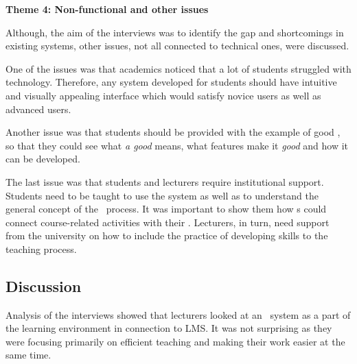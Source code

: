 \textbf{Theme 4: Non-functional and other issues}

Although, the aim of the interviews was to identify the gap and shortcomings in
existing systems, other issues, not all connected to technical ones, were
discussed.

One of the issues was that academics noticed that a lot of students struggled
with technology. Therefore, any system developed for students should have
intuitive and visually appealing interface which would satisfy novice users as
well as advanced users.



Another issue was that students should be provided with the example of good
\ep, so that they could see what \textit{a good \ep} means, what features make
it \textit{good} and how it can be developed.


The last issue was that students and lecturers require institutional support.
Students need to be taught to use the system as well as to understand the
general concept of the \ep~process. It was important to show them how \ep s
could connect course-related activities with their \LLLsn. Lecturers, in turn,
need support from the university on how to include the practice of developing
\LLLs skills to the teaching process.

 
\subsection{Discussion}
Analysis of the interviews showed that lecturers looked at an \ep~system as a
part of the learning environment in connection to LMS. It was not surprising as
they were focusing primarily on efficient teaching and making their work easier
at the same time.

